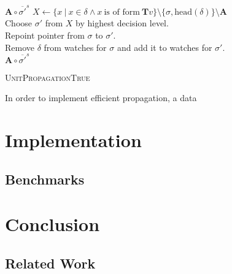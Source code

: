 \documentclass{vutinfth} %
\newcommand{\negstrong}[1]{\overline{#1}^s}
\begin{document}

\begin{algorithm}
  {
    {
      $\mathbf{A} \circ \negstrong{\sigma'}$
    }
  }
  {
    $X \leftarrow \{ x \ | \ x \in \delta \wedge x \ \text{is of form} \ \mathbf{T}v \} \setminus \{ \sigma, \text{head}(\delta) \} \setminus \mathbf{A} $\\
    {
      Choose $\sigma'$ from $X$ by highest decision level.\\
      Repoint pointer from $\sigma$ to $\sigma'$.\\
      Remove $\delta$ from watches for $\sigma$ and add it to watches for $\sigma'$.\\
    }
	{
	  $\mathbf{A} \circ \negstrong{\sigma'}$
	}
  }
  \caption{\textsc{UnitPropagationTrue}}
  \label{alg:prop-true}
\end{algorithm}

In order to implement efficient propagation, a data



\chapter{Implementation}

\section{Benchmarks}

\chapter{Conclusion}

\section{Related Work}
\end{document}
